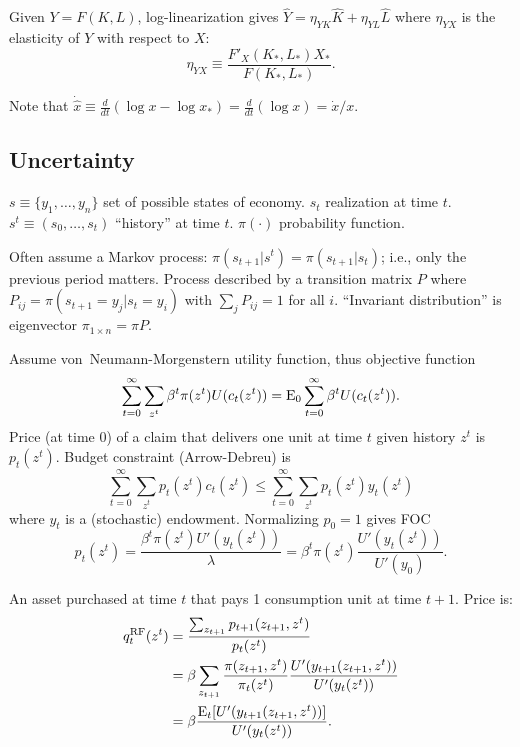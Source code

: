 \documentclass[8pt,letterpaper, landscape]{extarticle} %
\renewcommand{\ln}{\log}
\begin{document}
\begin{multicols}{3}
\begin{description}
Given $ Y = F(K,L) $, log-linearization gives $ \widehat{Y} = \eta_{YK} \widehat{K} + \eta_{YL} \widehat{L} $ where $ \eta_{YX} $ is the elasticity of $ Y $ with respect to $ X $:
$$ \eta_{YX} \equiv \frac{F'_{X} (K_*, L_*) X_*}{F(K_*, L_*)}. $$

Note that $ \dot{\hat{x}} \equiv \frac{d}{dt} (\ln x - \ln x_*) = \frac{d}{dt} (\ln x) = \dot{x} / x. $

\subsection{Uncertainty}
 $ s \equiv \{ y_1 , \dotsc , y_n \} $ set of possible states of economy. $ s_t $ realization at time $ t $. $ s^t \equiv (s_0, \dotsc , s_t) $ ``history'' at time $ t $. $ \pi (\cdot) $ probability function.

Often assume a Markov process: $ \pi (s_{t+1} | s^t) = \pi (s_{t+1} | s_t) $; i.e., only the previous period matters. Process described by a transition matrix $ P $ where $ P_{ij} = \pi (s_{t+1} = y_j | s_t = y_i) $ with $ \sum_{j} P_{ij} = 1 $ for all $ i $. ``Invariant distribution'' is eigenvector $ \pi_{1 \times n} = \pi P $.

 Assume von~Neumann-Morgenstern utility function, thus objective function
$$ \sum_{t = 0}^{\infty} \sum_{z^t} \beta^t \pi (z^t) U(c_t(z^t)) = \operatorname{E}_0 \sum_{t=0}^{\infty} \beta^t U(c_t(z^t)). $$
Price (at time $ 0 $) of a claim that delivers one unit at time $ t $ given history $ z^t $ is $ p_t (z^t) $. Budget constraint (Arrow-Debreu) is
$$ \sum_{t = 0}^{\infty} \sum_{z^t} p_t (z^t) c_t (z^t) \leq \sum_{t = 0}^{\infty} \sum_{z^t} p_t (z^t) y_t (z^t) $$
where $ y_t $ is a (stochastic) endowment. Normalizing $ p_0 = 1 $ gives FOC
$$ p_t (z^t) = \frac{\beta^t \pi (z^t) U'(y_t(z^t))}{\lambda} = \beta^t \pi (z^t) \frac{U'(y_t(z^t))}{U'(y_0)}. $$

 An asset purchased at time $ t $ that pays 1 consumption unit at time $ t+1 $. Price is:
\begin{align*}
q_t^{\text{RF}} (z^t) &= \frac{\sum_{z_{t+1}} p_{t+1} (z_{t+1}, z^t)}{p_t(z^t)} \\
&= \beta \sum_{z_{t+1}} \frac{ \pi (z_{t+1}, z^t)}{\pi_t(z^t)} \frac{U'(y_{t+1}(z_{t+1},z^t))}{U'(y_t(z^t))} \\
&= \beta \frac{\operatorname{E}_t [U'(y_{t+1} (z_{t+1}, z^t))]}{U'(y_t(z^t))}.
\end{align*}


\end{description}
\end{multicols}
\end{document}
